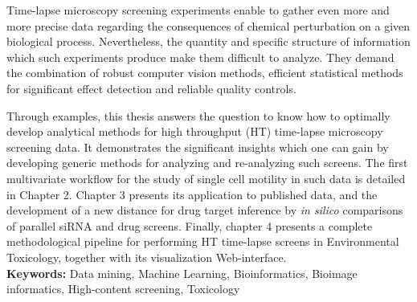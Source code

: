 \documentclass[11pt, oneside]{Thesis} %
\begin{document}
Time-lapse microscopy screening experiments enable to gather even more and more precise data regarding the consequences of chemical perturbation on a given biological process. Nevertheless, the quantity and specific structure of information which such experiments produce make them difficult to analyze. They demand the combination of robust computer vision methods, efficient statistical methods for significant effect detection and reliable quality controls.

Through examples, this thesis answers the question to know how to optimally develop analytical methods for high throughput (HT) time-lapse microscopy screening data. It demonstrates the significant insights which one can gain by developing generic methods for analyzing and re-analyzing such screens. The first multivariate workflow for the study of single cell motility in such data is detailed in Chapter 2. Chapter 3 presents its application to published data, and the development of a new distance for drug target inference by \textit{in silico} comparisons of parallel siRNA and drug screens.  Finally, chapter 4 presents a complete methodological pipeline for performing HT time-lapse screens in Environmental Toxicology, together with its visualization Web-interface.
\\
\noindent
{\large {\bf Keywords:}} Data mining, Machine Learning, Bioinformatics, Bioimage informatics, High-content screening, Toxicology
\end{document}

